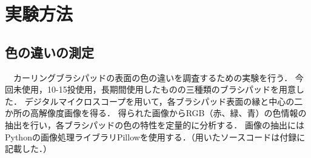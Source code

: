 \documentclass[main]{subfiles}
\begin{document}
\chapter{実験方法}
\section{色の違いの測定}
　カーリングブラシパッドの表面の色の違いを調査するための実験を行う．
今回未使用，10-15投使用，長期間使用したものの三種類のブラシパッドを用意した．
デジタルマイクロスコープを用いて，各ブラシパッド表面の縁と中心の二か所の高解像度画像を得る．
得られた画像からRGB（赤、緑、青）の色情報の抽出を行い，各ブラシパッドの色の特性を定量的に分析する．
画像の抽出にはPythonの画像処理ライブラリPillowを使用する．（用いたソースコードは付録に記載した．）
\end{document}
